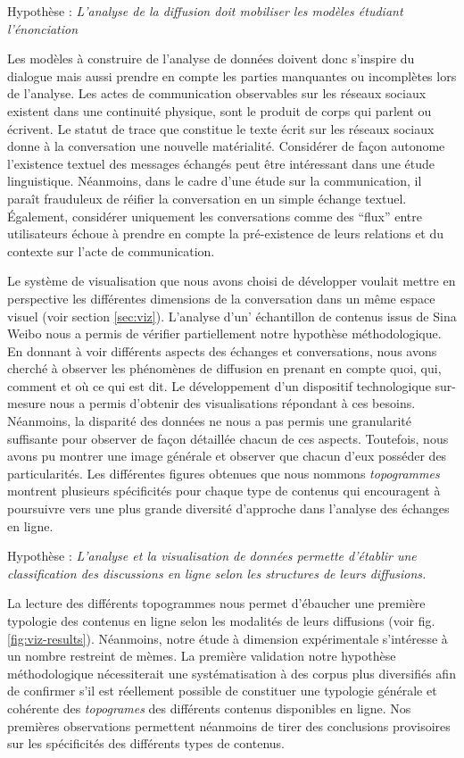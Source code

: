 Hypothèse : \textit{L'analyse de la diffusion doit mobiliser les modèles étudiant l'énonciation} 

Les modèles à construire de l'analyse de données doivent donc s'inspire du dialogue mais aussi prendre en compte les parties manquantes ou incomplètes lors de l'analyse. Les actes de communication observables sur les réseaux sociaux existent dans une continuité physique, sont le produit de corps qui parlent ou écrivent. Le statut de trace que constitue le texte écrit sur les réseaux sociaux donne à la conversation une nouvelle matérialité. Considérer de façon autonome l'existence textuel des messages échangés peut être intéressant dans une étude linguistique. Néanmoins, dans le cadre d'une étude sur la communication, il paraît frauduleux de réifier la conversation en un simple échange textuel. Également, considérer uniquement les conversations comme des ``flux'' entre utilisateurs échoue à prendre en compte la pré-existence de leurs relations et du contexte sur l'acte de communication. 

Le système de visualisation que nous avons choisi de développer voulait mettre en perspective les différentes dimensions de la conversation dans un même espace visuel (voir section \ref{sec:viz}). L'analyse d'un' échantillon de contenus issus de Sina Weibo nous a permis de vérifier partiellement notre hypothèse méthodologique. En donnant à voir différents aspects des échanges et conversations, nous avons cherché à observer les phénomènes de diffusion en prenant en compte quoi, qui, comment et où ce qui est dit. Le développement d'un dispositif technologique sur-mesure nous a permis d'obtenir des visualisations répondant à ces besoins. Néanmoins, la disparité des données ne nous a pas permis une granularité suffisante pour observer de façon détaillée chacun de ces aspects. Toutefois, nous avons pu montrer une image générale et observer que chacun d'eux posséder des particularités. Les différentes figures obtenues que nous nommons \textit{topogrammes} montrent plusieurs spécificités pour chaque type de contenus qui encouragent à poursuivre vers une plus grande diversité d'approche dans l'analyse des échanges en ligne.

Hypothèse : \textit{L'analyse et la visualisation de données permette d'établir une classification des discussions en ligne selon les structures de leurs diffusions.}


La lecture des différents topogrammes nous permet d'ébaucher une première typologie des contenus en ligne selon les modalités de leurs diffusions (voir fig. \ref{fig:viz-results}). Néanmoins, notre étude à dimension expérimentale s'intéresse à un nombre restreint de mèmes. La première validation notre hypothèse méthodologique nécessiterait une systématisation à des corpus plus diversifiés afin de confirmer s'il est réellement possible de constituer une typologie générale et cohérente des \textit{topogrames} des différents contenus disponibles en ligne. Nos premières observations permettent néanmoins de tirer des conclusions provisoires sur les spécificités des différents types de contenus.

